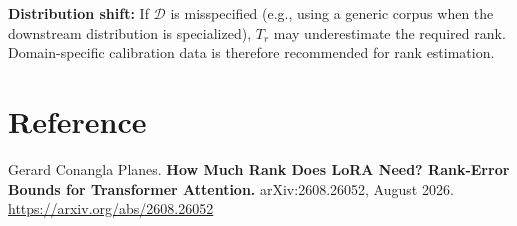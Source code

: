 \documentclass[10pt,twocolumn]{article}
\begin{document}
\textbf{Distribution shift:} If $\mathcal{D}$ is misspecified (e.g.,
using a generic corpus when the downstream distribution is specialized),
$T_r$ may underestimate the required rank. Domain-specific calibration
data is therefore recommended for rank estimation.

\section*{Reference}

Gerard Conangla Planes.
\textbf{How Much Rank Does LoRA Need? Rank-Error Bounds for
Transformer Attention.}
arXiv:2608.26052, August 2026.
\url{https://arxiv.org/abs/2608.26052}
\end{document}
